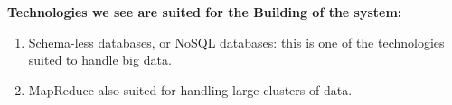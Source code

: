 \textbf{Technologies we see are suited for the Building of the system: }
\begin{enumerate}
    \item Schema-less databases, or NoSQL databases: this is one of the technologies suited to handle big data.
    \item MapReduce also suited for handling large clusters of data.
\end{enumerate}
